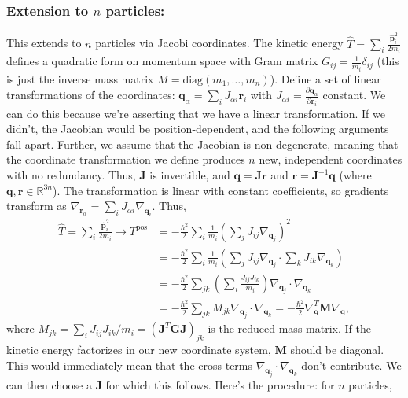 \subsubsection{\texorpdfstring{Extension to $n$ particles:}{Extension to n particles:}}
This extends to $n$ particles via Jacobi coordinates. The kinetic energy $\hat{T}=\sum_i \frac{\hat{\mathbf{p}}_i^2}{2m_i}$ defines a quadratic form on momentum space with Gram matrix $G_{ij}=\frac{1}{m_i}\delta_{ij}$ (this is just the inverse mass matrix $M=\text{diag}(m_1, \dots, m_n)$). Define a set of linear transformations of the coordinates: $\mathbf{q}_\alpha=\sum_i J_{\alpha i}\mathbf{r}_i$ with $J_{\alpha i} = \frac{\partial \mathbf{q}_\alpha}{\partial \mathbf{r}_i}$ constant. We can do this because we're asserting that we have a linear transformation. If we didn't, the Jacobian would be position-dependent, and the following arguments fall apart. Further, we assume that the Jacobian is non-degenerate, meaning that the coordinate transformation we define produces $n$ new, independent coordinates with no redundancy. Thus, $\mathbf{J}$ is invertible, and $\mathbf{q}=\mathbf{J r}$ and $\mathbf{r}=\mathbf{J}^{-1}\mathbf{q}$ (where $\mathbf{q},\mathbf{r}\in\mathbb{R}^{3n}$). The transformation is linear with constant coefficients, so gradients transform as $\nabla_{\mathbf{r}_\alpha}=\sum_i J_{\alpha i} \nabla_{\mathbf{q}_i}$. Thus,
\begin{align*}
    \hat{T}=\sum_i \frac{\hat{\mathbf{p}}_i^2}{2m_i} \rightarrow T^\text{pos}&= -\frac{\hbar^2}{2}\sum_i\frac{1}{m_i}\left(\sum_j J_{ij} \nabla_{\mathbf{q}_j}\right)^2\\
    &=-\frac{\hbar^2}{2}\sum_i \frac{1}{m_i}\left( \sum_{j} J_{ij}\nabla_{\mathbf{q}_j}\cdot\sum_k J_{ik}\nabla_{\mathbf{q}_k}\right)\\
    &= -\frac{\hbar^2}{2}\sum_{jk}\left(\sum_i \frac{J_{ij}J_{ik}}{m_i} \right)\nabla_{\mathbf{q}_j}\cdot\nabla_{\mathbf{q}_k}\\
    &= -\frac{\hbar^2}{2}\sum_{jk} M_{jk}\nabla_{\mathbf{q}_j}\cdot\nabla_{\mathbf{q}_k}= -\frac{\hbar^2}{2} \nabla_{\mathbf{q}}^T\mathbf{M}\nabla_{\mathbf{q}},
\end{align*}
where $M_{jk}=\sum_iJ_{ij}J_{ik}/m_i=(\mathbf{J}^T \mathbf{G J})_{jk}$ is the reduced mass matrix. If the kinetic energy factorizes in our new coordinate system, $\mathbf{M}$ should be diagonal. This would immediately mean that the cross terms $\nabla_{\mathbf{q}_j}\cdot\nabla_{\mathbf{q}_k}$ don't contribute. We can then choose a $\mathbf{J}$ for which this follows. Here's the procedure: for $n$ particles,
